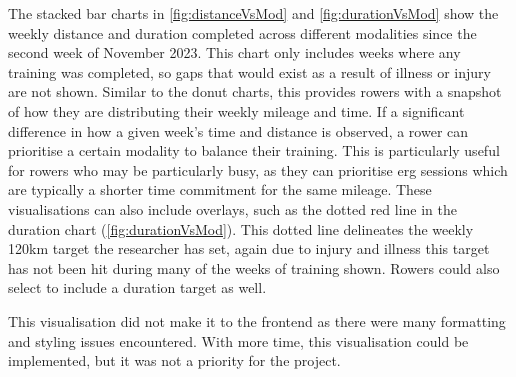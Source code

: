 The stacked bar charts in \autoref{fig:distanceVsMod} and \autoref{fig:durationVsMod} show the weekly distance and duration completed across different modalities since the second week of November 2023. This chart only includes weeks where any training was completed, so gaps that would exist as a result of illness or injury are not shown. Similar to the donut charts, this provides rowers with a snapshot of how they are distributing their weekly mileage and time. If a significant difference in how a given week's time and distance is observed, a rower can prioritise a certain modality to balance their training. This is particularly useful for rowers who may be particularly busy, as they can prioritise erg sessions which are typically a shorter time commitment for the same mileage. These visualisations can also include overlays, such as the dotted red line in the duration chart (\autoref{fig:durationVsMod}). This dotted line delineates the weekly 120km target the researcher has set, again due to injury and illness this target has not been hit during many of the weeks of training shown. Rowers could also select to include a duration target as well.

This visualisation did not make it to the frontend as there were many formatting and styling issues encountered. With more time, this visualisation could be implemented, but it was not a priority for the project.

